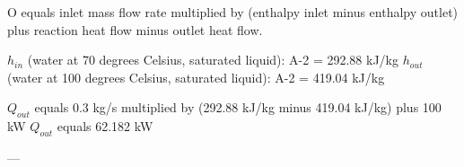 O equals inlet mass flow rate multiplied by (enthalpy inlet minus enthalpy outlet) plus reaction heat flow minus outlet heat flow.  

\( h_{in} \) (water at 70 degrees Celsius, saturated liquid): A-2 = 292.88 kJ/kg  
\( h_{out} \) (water at 100 degrees Celsius, saturated liquid): A-2 = 419.04 kJ/kg  

\( Q_{out} \) equals 0.3 kg/s multiplied by (292.88 kJ/kg minus 419.04 kJ/kg) plus 100 kW  
\( Q_{out} \) equals 62.182 kW  

---